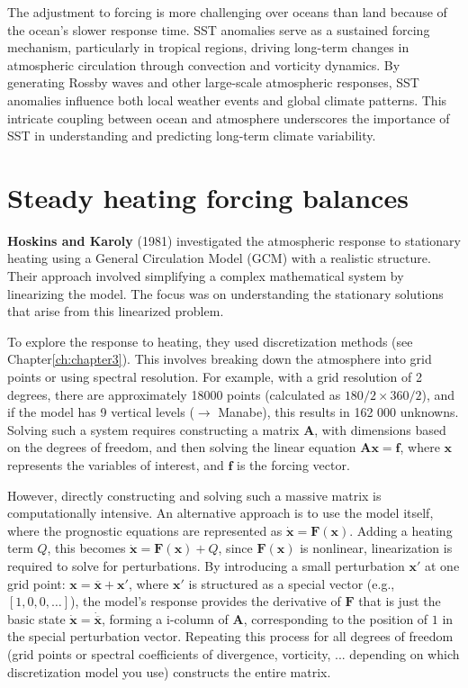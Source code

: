 The adjustment to forcing is more challenging over oceans than land because of the ocean’s slower response time. SST anomalies serve as a sustained forcing mechanism, particularly in tropical regions, driving long-term changes in atmospheric circulation through convection and vorticity dynamics. By generating Rossby waves and other large-scale atmospheric responses, SST anomalies influence both local weather events and global climate patterns. This intricate coupling between ocean and atmosphere underscores the importance of SST in understanding and predicting long-term climate variability.\\[0.25 cm]

\section{Steady heating forcing balances}
\textbf{Hoskins and Karoly}\cite{B.J.Hoskins1981} (1981) investigated the atmospheric response to stationary heating using a General Circulation Model (GCM) with a realistic structure. Their approach involved simplifying a complex mathematical system by linearizing the model. The focus was on understanding the stationary solutions that arise from this linearized problem.

To explore the response to heating, they used discretization methods (see Chapter\ref{ch:chapter3}). This involves breaking down the atmosphere into grid points or using spectral resolution. For example, with a grid resolution of 2 degrees, there are approximately 18000 points (calculated as $180/2\times360/2$), and if the model has 9 vertical levels ($\rightarrow$ Manabe), this results in 162 000 unknowns. Solving such a system requires constructing a matrix $\mathbf{A}$, with dimensions based on the degrees of freedom, and then solving the linear equation $\mathbf{A}\mathbf{x}=\mathbf{f}$, where 
$\mathbf{x}$ represents the variables of interest, and $\mathbf{f}$ is the forcing vector.

However, directly constructing and solving such a massive matrix is computationally intensive. An alternative approach is to use the model itself, where the prognostic equations are represented as $\mathbf{\dot{x}}=\mathbf{F(x)}$. Adding a heating term $Q$, this becomes $\mathbf{\dot{x}=F(x)}+Q$, since $\mathbf{F(x)}$ is nonlinear, linearization is required to solve for perturbations. By introducing a small perturbation $\mathbf{x'}$ at one grid point: $\mathbf{x=\overline{x}+x'}$, where $\mathbf{x'}$  is structured as a special vector (e.g., $[1,0,0,\dots]$), the model’s response provides the derivative of $\mathbf{F}$ that is just the basic state $\mathbf{\dot{x}=\dot{\overline{x}}}$, forming a i-column of $\mathbf{A}$, corresponding to the position of $1$ in the special perturbation vector. Repeating this process for all degrees of freedom (grid points or spectral coefficients of divergence, vorticity, ... depending on which discretization model you use) constructs the entire matrix.

